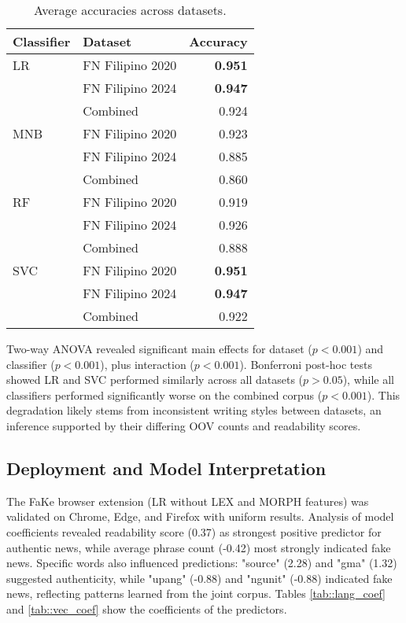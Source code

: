 \documentclass[conference]{IEEEtran}
\begin{document}
\begin{table}[!t]
\centering
\caption{Average accuracies across datasets.}
\label{tab:AverageAccuracies}
\begin{tabular}{llr}
\hline
\textbf{Classifier} & \textbf{Dataset} & \textbf{Accuracy} \\
\hline
LR & FN Filipino 2020 & \textbf{0.951} \\
 & FN Filipino 2024 & \textbf{0.947} \\
 & Combined & 0.924 \\
\hline
MNB & FN Filipino 2020 & 0.923 \\
 & FN Filipino 2024 & 0.885 \\
 & Combined & 0.860 \\
\hline
RF & FN Filipino 2020 & 0.919 \\
 & FN Filipino 2024 & 0.926 \\
 & Combined & 0.888 \\
\hline
SVC & FN Filipino 2020 & \textbf{0.951} \\
 & FN Filipino 2024 & \textbf{0.947} \\
 & Combined & 0.922 \\
\hline
\end{tabular}
\end{table}

Two-way ANOVA revealed significant main effects for dataset ($p<0.001$) and classifier ($p<0.001$), plus interaction ($p<0.001$). Bonferroni post-hoc tests showed LR and SVC performed similarly across all datasets ($p>0.05$), while all classifiers performed significantly worse on the combined corpus ($p<0.001$). This degradation likely stems from inconsistent writing styles between datasets, an inference supported by their differing OOV counts and readability scores.

\subsection{Deployment and Model Interpretation}
The FaKe browser extension (LR without LEX and MORPH features) was validated on Chrome, Edge, and Firefox with uniform results. Analysis of model coefficients revealed readability score (0.37) as strongest positive predictor for authentic news, while average phrase count (-0.42) most strongly indicated fake news. Specific words also influenced predictions: "source" (2.28) and "gma" (1.32) suggested authenticity, while "upang" (-0.88) and "ngunit" (-0.88) indicated fake news, reflecting patterns learned from the joint corpus. Tables \ref{tab::lang_coef} and \ref{tab::vec_coef} show the coefficients of the predictors.
\end{document}
